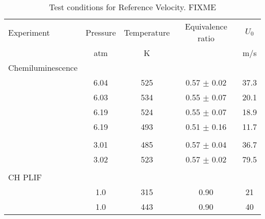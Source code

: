 \begin{table}
  \caption[Test conditions for Reference Velocity]{Test conditions for Reference Velocity. FIXME}
  \begin{center}
    \begin{tabular}{lcccc}
      Experiment & Pressure & Temperature & Equivalence ratio & \(U_0\) \tabularnewline
      & atm & K & & m/s \tabularnewline
      \hline\hline
      Chemiluminescence & & & & \tabularnewline
      \hline
      & 6.04 & 525 & 0.57 \(\pm\) 0.02 & 37.3 \tabularnewline
      & 6.03 & 534 & 0.55 \(\pm\) 0.07 & 20.1 \tabularnewline
      & 6.19 & 524 & 0.55 \(\pm\) 0.07 & 18.9 \tabularnewline
      & 6.19 & 493 & 0.51 \(\pm\) 0.16 & 11.7 \tabularnewline
      & & & & \tabularnewline
      & 3.01 & 485 & 0.57 \(\pm\) 0.04 & 36.7 \tabularnewline
      & 3.02 & 523 & 0.57 \(\pm\) 0.02 & 79.5 \tabularnewline
      & & & & \tabularnewline
      CH PLIF & & & & \tabularnewline
      \hline
      & 1.0 & 315 & 0.90 & 21 \tabularnewline
      & 1.0 & 443 & 0.90 & 40 \tabularnewline
      \hline
    \end{tabular}
  \end{center}
  \label{tab:referenceVelocityCases}
\end{table}

